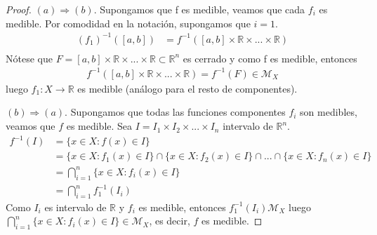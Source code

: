 \begin{proof}
    $(a) \Longrightarrow (b)$. Supongamos que f es medible, veamos que cada $f_i$ es medible. Por comodidad en la notación, supongamos que $i = 1$.
    \begin{align*}
        (f_1)^{-1}([a,b]) & = f^{-1}([a,b] \times \mathbb{R} \times ... \times \mathbb{R}) \\
    \end{align*}
    Nótese que $F = [a,b] \times \mathbb{R} \times ... \times \mathbb{R} \subset \mathbb{R}^n$ es cerrado y como f es medible, entonces
    \begin{align*}
        f^{-1}([a,b] \times \mathbb{R} \times ... \times \mathbb{R}) = f^{-1}(F) \in \mathcal{M}_X
    \end{align*}
    luego $f_1: X \longrightarrow \mathbb{R}$ es medible (análogo para el resto de componentes).

    $(b) \Longrightarrow (a)$. Supongamos que todas las funciones componentes $f_i$ son medibles, veamos que $f$ es medible. Sea $I = I_1 \times I_2 \times ... \times I_n$ intervalo de $\mathbb{R}^n$.
    \begin{align*}
        f^{-1}(I) & = \{ x \in X : f(x) \in I\}                                                                              \\
                  & = \{ x \in X : f_1(x) \in I\} \cap \{ x \in X : f_2(x) \in I\} \cap ... \cap \{ x \in X : f_n(x) \in I\} \\
                  & = \bigcap_{i=1}^{n}{\{ x \in X : f_i(x) \in I\}}                                                         \\
                  & = \bigcap_{i=1}^{n}{f_{1}^{-1}(I_i)}
    \end{align*}
    Como $I_i$ es intervalo de $\mathbb{R}$ y $f_i$ es medible, entonces $f_{1}^{-1}(I_i) \mathcal{M}_X$ luego $\bigcap_{i=1}^{n}{\{ x \in X : f_i(x) \in I\}} \in \mathcal{M}_X$, es decir, $f$ es medible.
\end{proof}

